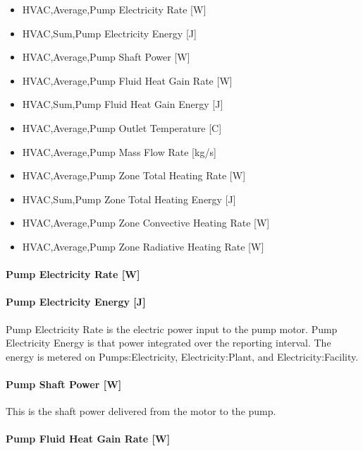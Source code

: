 \begin{itemize}
\item
  HVAC,Average,Pump Electricity Rate {[}W{]}
\item
  HVAC,Sum,Pump Electricity Energy {[}J{]}
\item
  HVAC,Average,Pump Shaft Power {[}W{]}
\item
  HVAC,Average,Pump Fluid Heat Gain Rate {[}W{]}
\item
  HVAC,Sum,Pump Fluid Heat Gain Energy {[}J{]}
\item
  HVAC,Average,Pump Outlet Temperature {[}C{]}
\item
  HVAC,Average,Pump Mass Flow Rate {[}kg/s{]}
\item
  HVAC,Average,Pump Zone Total Heating Rate {[}W{]}
\item
  HVAC,Sum,Pump Zone Total Heating Energy {[}J{]}
\item
  HVAC,Average,Pump Zone Convective Heating Rate {[}W{]}
\item
  HVAC,Average,Pump Zone Radiative Heating Rate {[}W{]}
\end{itemize}

\paragraph{Pump Electricity Rate {[}W{]}}\label{pump-electric-power-w}

\paragraph{Pump Electricity Energy {[}J{]}}\label{pump-electric-energy-j}

Pump Electricity Rate is the electric power input to the pump motor. Pump Electricity Energy is that power integrated over the reporting interval. The energy is metered on Pumps:Electricity, Electricity:Plant, and Electricity:Facility.

\paragraph{Pump Shaft Power {[}W{]}}\label{pump-shaft-power-w}

This is the shaft power delivered from the motor to the pump.

\paragraph{Pump Fluid Heat Gain Rate {[}W{]}}\label{pump-fluid-heat-gain-rate-w}

